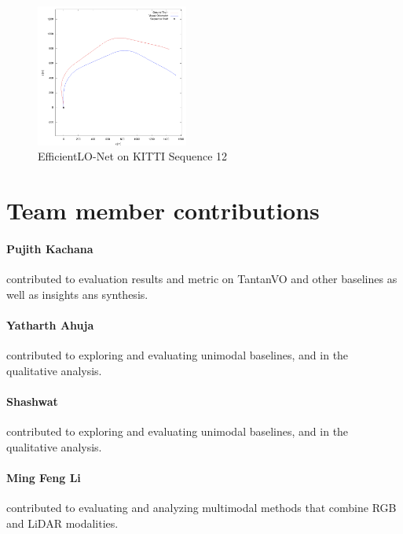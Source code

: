 \documentclass[11pt,a4paper]{article}
\begin{document}
\begin{figure}
    \centering
    \includegraphics[width=5cm]{Reports/3-Analysis-of-Baselines/images/Efficeint_Lonet.png}
    \caption{EfficientLO-Net on KITTI Sequence 12}
    \label{fig:lo-net}
\end{figure}
 

\section{Team member contributions}
\paragraph{Pujith Kachana} contributed to evaluation results and metric on TantanVO and other baselines as well as insights ans synthesis.

\paragraph{Yatharth Ahuja} contributed to exploring and evaluating unimodal baselines, and in the qualitative analysis.

\paragraph{Shashwat} contributed to exploring and evaluating unimodal baselines, and in the qualitative analysis.

\paragraph{Ming Feng Li} contributed to evaluating and analyzing multimodal methods that combine RGB and LiDAR modalities.




\end{document}
